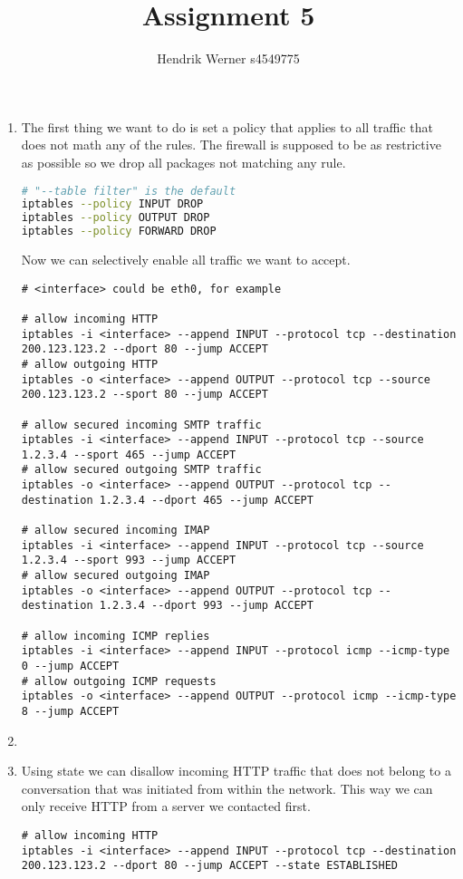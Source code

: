\documentclass[12pt, a4paper]{article}
\title{Assignment 5}
\author{Hendrik Werner s4549775}
\begin{document}
\maketitle

\section{} %
\begin{enumerate}[a]
	\item %
	The first thing we want to do is set a policy that applies to all traffic that does not math any of the rules. The firewall is supposed to be as restrictive as possible so we drop all packages not matching any rule.

	\begin{lstlisting}[language=bash]
# "--table filter" is the default
iptables --policy INPUT DROP
iptables --policy OUTPUT DROP
iptables --policy FORWARD DROP
	\end{lstlisting}

	Now we can selectively enable all traffic we want to accept.

	\begin{lstlisting}
# <interface> could be eth0, for example

# allow incoming HTTP
iptables -i <interface> --append INPUT --protocol tcp --destination 200.123.123.2 --dport 80 --jump ACCEPT
# allow outgoing HTTP
iptables -o <interface> --append OUTPUT --protocol tcp --source 200.123.123.2 --sport 80 --jump ACCEPT

# allow secured incoming SMTP traffic
iptables -i <interface> --append INPUT --protocol tcp --source 1.2.3.4 --sport 465 --jump ACCEPT
# allow secured outgoing SMTP traffic
iptables -o <interface> --append OUTPUT --protocol tcp --destination 1.2.3.4 --dport 465 --jump ACCEPT

# allow secured incoming IMAP
iptables -i <interface> --append INPUT --protocol tcp --source 1.2.3.4 --sport 993 --jump ACCEPT
# allow secured outgoing IMAP
iptables -o <interface> --append OUTPUT --protocol tcp --destination 1.2.3.4 --dport 993 --jump ACCEPT

# allow incoming ICMP replies
iptables -i <interface> --append INPUT --protocol icmp --icmp-type 0 --jump ACCEPT
# allow outgoing ICMP requests
iptables -o <interface> --append OUTPUT --protocol icmp --icmp-type 8 --jump ACCEPT
	\end{lstlisting}
	\item %
	\item %
	Using state we can disallow incoming HTTP traffic that does not belong to a conversation that was initiated from within the network. This way we can only receive HTTP from a server we contacted first.

	\begin{lstlisting}
# allow incoming HTTP
iptables -i <interface> --append INPUT --protocol tcp --destination 200.123.123.2 --dport 80 --jump ACCEPT --state ESTABLISHED
	\end{lstlisting}
\end{enumerate}
\end{document}
